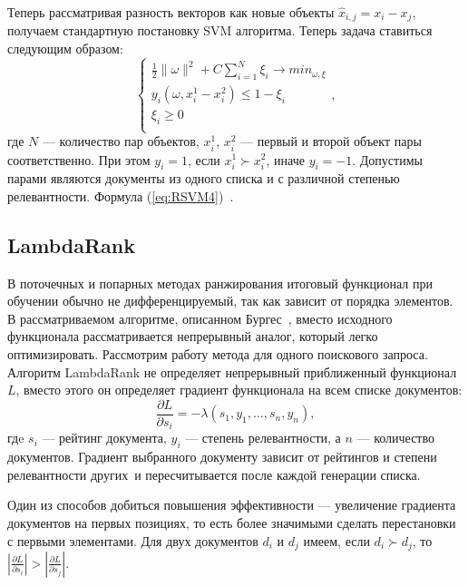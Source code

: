 Теперь рассматривая разность векторов как новые объекты $\hat{x}_{i, j} = x_{i} - x_{j}$, получаем стандартную постановку SVM алгоритма. Теперь задача ставиться следующим образом:
\begin{equation}
\begin{cases}
	\label{eq:RSVM4}
	\frac{1}{2}\| \omega \|^2+C  \displaystyle\sum_{i=1}^{N} \xi_{i}\to min_{\omega, \xi} \\
	y_{i}(\omega, x_{i}^1 - x_{i}^2) \leq 1 - \xi_{i} \\
	\xi_{i} \geq 0 \\
\end{cases},
\end{equation}
где $N$ --- количество пар объектов, $x_{i}^1$, $x_{i}^2$ --- первый и второй объект пары соответственно. При этом $y_{i} = 1$, если $x_{i}^1 \succ x_{i}^2$, иначе  $y_{i} = -1$. Допустимы парами являются документы из одного списка и с различной степенью релевантности. Формула (\ref{eq:RSVM4})~\cite{RankSVM}.

\subsection{LambdaRank}

В поточечных и попарных методах ранжирования итоговый функционал при обучении обычно не дифференцируемый, так как зависит от порядка элементов. В рассматриваемом алгоритме, описанном Бургес~\cite{LamdaRank}, вместо исходного функционала рассматривается непрерывный аналог, который легко оптимизировать.
Рассмотрим работу метода для одного поискового запроса. Алгоритм LambdaRank не определяет непрерывный приближенный функционал $L$, вместо этого он определяет градиент функционала на всем списке документов:
\begin{equation}
	\label{eq:LBR1}
	\frac{\partial L}{\partial s_{i}} = -\lambda(s_{1}, y_{1}, \dots, s_{n}, y_{n}),
\end{equation}
гдe $s_{i}$ --- рейтинг документа, $y_{i}$ --- степень релевантности, а $n$ --- количество документов. Градиент выбранного документу зависит от рейтингов и степени релевантности других\ и пересчитывается после каждой генерации списка.

Один из способов добиться повышения эффективности --- увеличение градиента документов на первых позициях, то есть более значимыми сделать перестановки с первыми элементами. Для двух документов $d_{i}$ и $d_{j}$ имеем, если $d_{i} \succ d_{j}$, то $| \frac{\partial L}{\partial s_{i}} | > | \frac{\partial L}{\partial s_{j}} |$.

